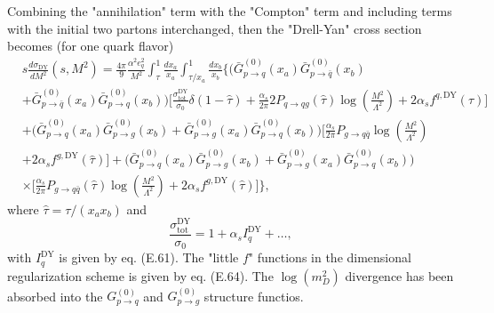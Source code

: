 Combining the "annihilation" term with the "Compton" term and including terms with the initial two partons interchanged, then the "Drell-Yan" cross section becomes (for one quark flavor)
\begin{align}
&s\frac{d\sigma_\text{DY}}{dM^2}(s,M^2)=\frac{4\pi}{9}\frac{\alpha^2e^2_q}{M^2}\int_{\tau}^{1}\frac{dx_a}{x_a}\int_{\tau/x_a}^{1}\frac{dx_b}{x_b}\biggl\{ \biggl( \bar{G}^{(0)}_{p\to q}(x_a)\bar{G}^{(0)}_{p\to \bar{q}}(x_b)\nonumber\\
&+ \bar{G}^{(0)}_{p\to \bar{q}}(x_a)\bar{G}^{(0)}_{p\to q}(x_b) \biggr)\biggl[ \frac{\sigma^\text{DY}_\text{tot}}{\sigma_0}\delta(1-\hat{\tau}) +\frac{\alpha_s}{2\pi}2P_{q\to qg}(\hat{\tau})\log\left(\frac{M^2}{\Lambda^2}\right)+2\alpha_sf^{q,\text{DY}}(\hat{\tau})\biggr]\nonumber\\
&+\biggl( \bar{G}^{(0)}_{p\to q}(x_a)\bar{G}^{(0)}_{p\to g}(x_b)+\bar{G}^{(0)}_{p\to g}(x_a)\bar{G}^{(0)}_{p\to q}(x_b) \biggr)\biggl[ \frac{\alpha_s}{2\pi}P_{g\to
 q\bar{q}}\log\left(\frac{M^2}{\Lambda^2}\right)\nonumber\\
&+2\alpha_sf^{g,\text{DY}}(\hat{\tau})\biggr]+\biggl( \bar{G}^{(0)}_{p\to q}(x_a)\bar{G}^{(0)}_{p\to g}(x_b)+\bar{G}^{(0)}_{p\to g}(x_a)\bar{G}^{(0)}_{p\to q}(x_b) \biggr)\nonumber\\
&\times\biggl[ \frac{\alpha_s}{2\pi}P_{g\to q\bar{q}}(\hat{\tau})\log\left(\frac{M^2}{\Lambda^2}\right)+2\alpha_sf^{g,\text{DY}}(\hat{\tau})\biggr] \biggr\},
\end{align}
where $\hat{\tau}=\tau/(x_ax_b)$ and 
\begin{equation}
\frac{\sigma^\text{DY}_\text{tot}}{\sigma_0}=1+\alpha_s I_q^\text{DY}+\ldots,
\end{equation}
with $I^\text{DY}_q$ is given by eq. (E.61). The "little $f$" functions in the dimensional regularization scheme is given by eq. (E.64). The $\log(m^2_D)$ divergence has been absorbed into the $G^{(0)}_{p\to q}$ and $G^{(0)}_{p\to g}$ structure functios.  
